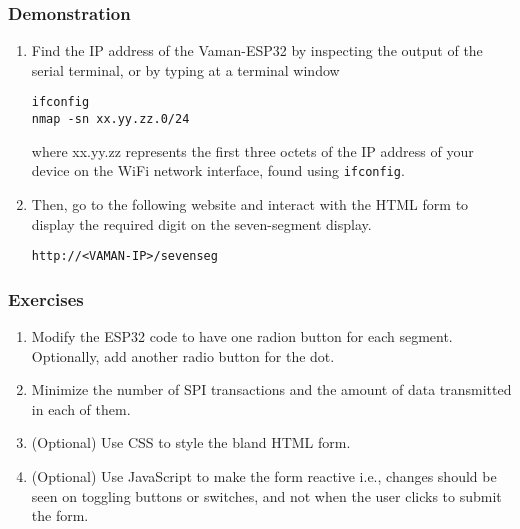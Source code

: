 \subsubsection{Demonstration}
\begin{enumerate}[resume]
    \item Find the IP address of the Vaman-ESP32 by inspecting the output of the
    serial terminal, or by typing at a terminal window
    \begin{lstlisting}
ifconfig
nmap -sn xx.yy.zz.0/24
    \end{lstlisting}
    where xx.yy.zz represents the first three octets of the IP address of your
    device on the WiFi network interface, found using \texttt{ifconfig}.
    \item Then, go to the following website and interact with the HTML form to
    display the required digit on the seven-segment display.
    \begin{lstlisting}
http://<VAMAN-IP>/sevenseg
    \end{lstlisting}
\end{enumerate}

\subsubsection{Exercises}
\begin{enumerate}[resume]
    \item Modify the ESP32 code to have one radion button for each segment.
    Optionally, add another radio button for the dot.
    \item Minimize the number of SPI transactions and the amount of data
    transmitted in each of them.
    \item (Optional) Use CSS to style the bland HTML form.
    \item (Optional) Use JavaScript to make the form reactive i.e., changes
    should be seen on toggling buttons or switches, and not when the user clicks
    to submit the form.
\end{enumerate}